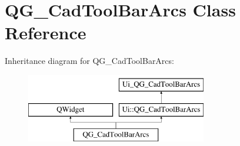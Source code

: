 \hypertarget{classQG__CadToolBarArcs}{\section{Q\-G\-\_\-\-Cad\-Tool\-Bar\-Arcs Class Reference}
\label{classQG__CadToolBarArcs}
}
Inheritance diagram for Q\-G\-\_\-\-Cad\-Tool\-Bar\-Arcs\-:\begin{figure}[H]
\begin{center}
\leavevmode
\includegraphics[height=3.000000cm]{classQG__CadToolBarArcs}
\end{center}
\end{figure}
